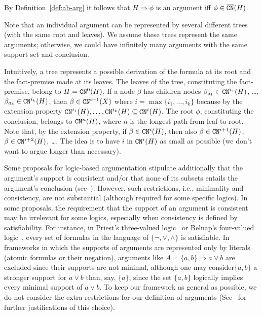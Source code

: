 \begin{remark}
 By Definition~\ref{def:ab-arg} it follows that $ H \Rightarrow \phi$ is an argument iff $\phi \in \overline{\texttt{\textup{CN}}}(H)$.   
\end{remark}



Note that an individual argument can be represented by several different trees (with the same root and leaves). We assume these trees represent the same arguments; otherwise, we could have infinitely many arguments with the same support set and conclusion.

Intuitively, a tree represents a possible derivation of the formula at its root and the fact-premise made at its leaves.
The leaves of the tree, constituting the fact-premise, belong to $H = \texttt{\textup{CN}}^0 (H)$.
If a node $\beta$ has children nodes
$\beta_{a_1} \in \texttt{\textup{CN}}^{i_1} (H)$, \ldots, $\beta_{a_k} \in \texttt{\textup{CN}}^{i_k} (H)$,
then $\beta \in \texttt{\textup{CN}}^{i+1}(X)$ where $i=\max\{i_1,\ldots,i_k\}$ because by the extension property $\texttt{\textup{CN}}^{i_1} (H),\ldots,\texttt{\textup{CN}}^{i_k} (H)\subseteq \texttt{\textup{CN}}^{i}(H)$.
The root $\phi$, constituting the conclusion, belongs to $\texttt{\textup{CN}}^n(H)$,
where $n$ is the longest path from leaf to root.
Note that, by the extension property,
if $\beta \in \texttt{\textup{CN}}^i(H)$, then also $\beta \in \texttt{\textup{CN}}^{i+1}(H)$, $\beta \in \texttt{\textup{CN}}^{i+2}(H)$, \ldots.
The idea is to have $i$ in $\texttt{\textup{CN}}^i(H)$ as small as possible (we don't want to argue
longer than necessary).





Some proposals for logic-based argumentation stipulate additionally that the argument's support is consistent and/or that none of its subsets entails the argument's conclusion (see~\cite{Hunter2010}).
However, such restrictions, i.e., minimality and consistency, are not substantial (although required for some specific logics).
In some proposals, the requirement that the support of an argument is consistent may be irrelevant for some logics, especially when consistency is defined by satisfiability.
For instance, in Priest’s three-valued logic~\cite{Priest89} or Belnap’s four-valued logic~\cite{Belnap1977}, every set of formulas in the language of $\{ \neg, \vee, \wedge\}$ is satisfiable.
In frameworks in which the supports of arguments are represented only by literals (atomic formulas or their negation),  arguments like $A = \{a, b\} \Rightarrow a \vee b$ are excluded since their supports are not minimal, although one may consider$\{a, b\}$ a stronger support for $a \vee b$ than, say, $\{a\}$, 
since the set $\{a, b\}$ logically implies every minimal support of $a \vee b$.
To keep our framework as general as possible, we do not consider the extra restrictions for our definition of arguments (See~\cite{Hunter2010,ArieliS19} for further justifications of this choice).

